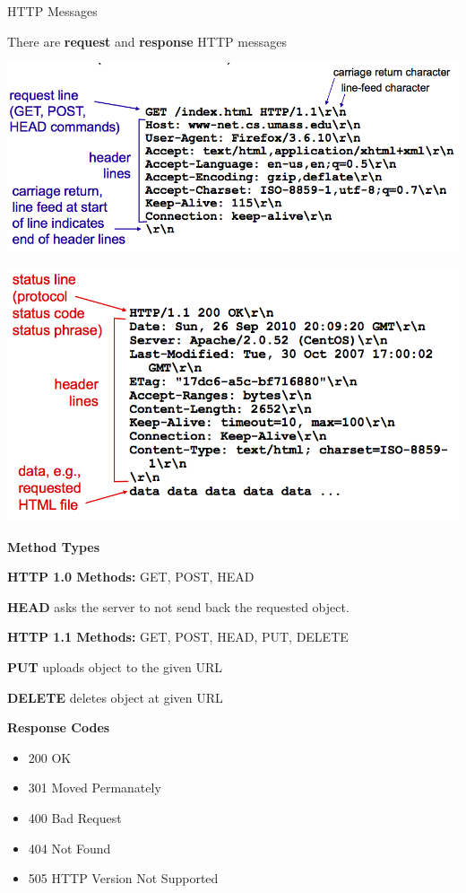 \begin{topic}{HTTP Messages}

There are \textbf{request} and \textbf{response} HTTP messages

\begin{subtopic}{2}
\includegraphics[scale=0.35]{coms3200/images/request}
\end{subtopic}

\begin{subtopic}{3}
\includegraphics[scale=0.35]{coms3200/images/response}
\end{subtopic}

\begin{subtopic}{4}
\textbf{Method Types}
\begin{multicols}{2}
\textbf{HTTP 1.0 Methods:} GET, POST, HEAD

\textbf{HEAD} asks the server to not send back the requested object.

\columnbreak

\textbf{HTTP 1.1 Methods:} GET, POST, HEAD, PUT, DELETE

\textbf{PUT} uploads object to the given URL

\textbf{DELETE} deletes object at given URL
\end{multicols}
\end{subtopic}

\begin{subtopic}{5}
\textbf{Response Codes}

\begin{itemize}
	\item 200 OK
	\item 301 Moved Permanately
	\item 400 Bad Request
	\item 404 Not Found
	\item 505 HTTP Version Not Supported
\end{itemize}

\end{subtopic}

\end{topic}